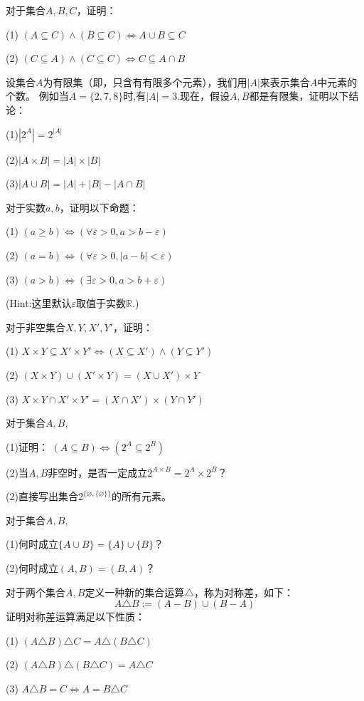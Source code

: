 \begin{prob}对于集合$A,B,C$，证明：

(1) $(A\subseteq C)\wedge(B\subseteq C)\Leftrightarrow A\cup B\subseteq C$

(2) $(C\subseteq A)\wedge(C\subseteq C)\Leftrightarrow C\subseteq A\cap B$
\end{prob}\vs

\begin{prob}[元素的个数]
设集合$A$为有限集（即，只含有有限多个元素），我们用$|A|$来表示集合$A$中元素的个数。
例如当$A=\{2,7,8\}$时,有$|A|=3$.现在，假设$A,B$都是有限集，证明以下结论：

(1)$|2^A|=2^{|A|}$

(2)$|A\times B|=|A|\times|B|$

(3)$|A\cup B|=|A|+|B|-|A\cap B|$
\end{prob}\vs


\begin{prob}对于实数$a,b$，证明以下命题：

(1) $(a\geq b)\Leftrightarrow(\forall\varepsilon>0,a>b-\varepsilon)$

(2) $(a=b)\Leftrightarrow(\forall\varepsilon>0,|a-b|<\varepsilon)$

(3) $(a>b)\Leftrightarrow(\exists\varepsilon>0,a>b+\varepsilon)$

\end{prob}

(Hint:这里默认$\varepsilon$取值于实数$\mathbb{R}$.)\vs

\begin{prob}对于非空集合$X,Y,X',Y'$，证明：

(1) $X\times Y\subseteq X'\times Y' \Leftrightarrow (X\subseteq X')\wedge(Y\subseteq Y')$

(2) $(X\times Y)\cup(X'\times Y)=(X\cup X')\times Y$

(3) $X\times Y\cap X'\times Y'=(X\cap X')\times(Y\cap Y')$
\end{prob}\vs

\begin{prob} 对于集合$A,B$,

(1)证明： $(A\subseteq B)\Leftrightarrow (2^A\subseteq 2^B)$

(2)当$A,B$非空时，是否一定成立$2^{A\times B}=2^A\times2^B$？

(2)直接写出集合$2^{\{\varnothing,\{\varnothing\}\}}$的所有元素。

\end{prob}\vs

\begin{prob}对于集合$A,B$,

(1)何时成立$\{A\cup B\}=\{A\}\cup\{B\}$？

(2)何时成立$(A,B)=(B,A)$？
\end{prob}\vs

\begin{prob}[集合的对称差]

对于两个集合$A,B$定义一种新的集合运算$\triangle$，称为对称差，如下：
$$A\triangle B:=(A-B)\cup(B-A)$$
证明对称差运算满足以下性质：

(1) $(A\triangle B)\triangle C=A\triangle(B\triangle C)$

(2) $(A\triangle B)\triangle (B\triangle C)=A\triangle C$

(3) $A\triangle B=C\Leftrightarrow A=B\triangle C$
\end{prob}
